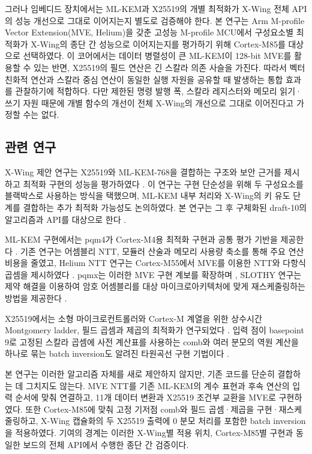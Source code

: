 \documentclass[runningheads,orivec]{llncs}
\newcommand{\xwing}{X-Wing}
\begin{document}
그러나 임베디드 장치에서는 ML-KEM과 X25519의 개별 최적화가 \xwing{} 전체 API의
성능 개선으로 그대로 이어지는지 별도로 검증해야 한다. 본 연구는 Arm M-profile
Vector Extension(MVE, Helium)을 갖춘 고성능 M-profile MCU에서 구성요소별 최적화가
\xwing{}의 종단 간 성능으로 이어지는지를 평가하기 위해 Cortex-M85를 대상으로
선택하였다. 이 코어에서는 데이터 병렬성이 큰 ML-KEM이 128-bit MVE를 활용할 수
있는 반면, X25519의 필드 연산은 긴 스칼라 의존 사슬을 가진다. 따라서 벡터 친화적
연산과 스칼라 중심 연산이 동일한 실행 자원을 공유할 때 발생하는 통합 효과를 관찰하기에
적합하다. 다만 제한된 명령 발행 폭, 스칼라 레지스터와 메모리 읽기·쓰기 자원 때문에
개별 함수의 개선이 전체 \xwing{}의 개선으로 그대로 이어진다고 가정할 수는 없다.

\subsection{관련 연구}

\xwing{} 제안 연구는 X25519와 ML-KEM-768을 결합하는 구조와 보안 근거를 제시하고
최적화 구현의 성능을 평가하였다 \cite{XWing24}. 이 연구는 구현 단순성을 위해 두
구성요소를 블랙박스로 사용하는 방식을 택했으며, ML-KEM 내부 처리와 \xwing{}의 키
유도 단계를 결합하는 추가 최적화 가능성도 논의하였다. 본 연구는 그 후 구체화된
draft-10의 알고리즘과 API를 대상으로 한다 \cite{XWingDraft10}.

ML-KEM 구현에서는 pqm4가 Cortex-M4용 최적화 구현과 공통 평가 기반을 제공한다
\cite{pqm4}. 기존 연구는 어셈블리 NTT, 모듈러 산술과 메모리 사용량 축소를 통해
주요 연산 비용을 줄였고, Helium NTT 연구는 Cortex-M55에서 MVE를 이용한 NTT와
다항식 곱셈을 제시하였다 \cite{HeliumNTT22}. pqmx는 이러한 MVE 구현 계보를
확장하며 \cite{pqmx}, SLOTHY 연구는 제약 해결을 이용하여 암호 어셈블리를 대상
마이크로아키텍처에 맞게 재스케줄링하는 방법을 제공한다
\cite{Slothy22,SlothyM7_25}.

X25519에서는 소형 마이크로컨트롤러와 Cortex-M 계열을 위한 상수시간 Montgomery
ladder, 필드 곱셈과 제곱의 최적화가 연구되었다
\cite{RFC7748,Lenngren,FujiiAranha17,DullEtAl15}. 입력 점이 basepoint 9로 고정된
스칼라 곱셈에 사전 계산표를 사용하는 comb와 여러 분모의 역원 계산을 하나로 묶는
batch inversion도 알려진 타원곡선 구현 기법이다 \cite{GuideECC04}.

본 연구는 이러한 알고리즘 자체를 새로 제안하지 않지만, 기존 코드를 단순히 결합하는
데 그치지도 않는다. MVE NTT를 기존 ML-KEM의 계수 표현과 후속 연산의 입력 순서에
맞춰 연결하고, 11개 데이터 변환과 X25519 조건부 교환을 MVE로 구현하였다. 또한
Cortex-M85에 맞춰 고정 기저점 comb와 필드 곱셈·제곱을 구현·재스케줄링하고,
\xwing{} 캡슐화의 두 X25519 출력에 0 분모 처리를 포함한 batch inversion을
적용하였다. 기여의 경계는 이러한 \xwing{}별 적용 위치, Cortex-M85별 구현과 동일한
보드의 전체 API에서 수행한 종단 간 검증이다.
\end{document}
